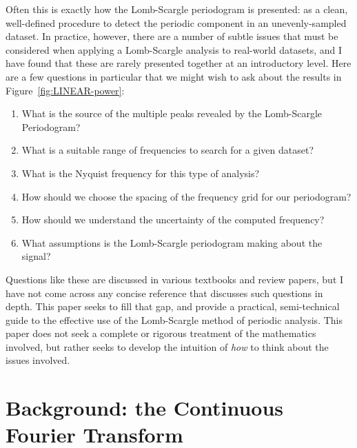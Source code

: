 \documentclass[preprint]{aastex}
\newcommand{\fig}[1]{Figure~\ref{fig:#1}}
\begin{document}
Often this is exactly how the Lomb-Scargle periodogram is presented: as a clean, well-defined procedure to detect the periodic component in an unevenly-sampled dataset.
In practice, however, there are a number of subtle issues that must be considered when applying a Lomb-Scargle analysis to real-world datasets, and I have found that these are rarely presented together at an introductory level.
Here are a few questions in particular that we might wish to ask about the results in \fig{LINEAR-power}:
\begin{enumerate}
  \item What is the source of the multiple peaks revealed by the Lomb-Scargle Periodogram?
  \item What is a suitable range of frequencies to search for a given dataset?
  \item What is the Nyquist frequency for this type of analysis?
  \item How should we choose the spacing of the frequency grid for our periodogram?
  \item How should we understand the uncertainty of the computed frequency?
  \item What assumptions is the Lomb-Scargle periodogram making about the signal?
\end{enumerate}
Questions like these are discussed in various textbooks and review papers, but I have not come across any concise reference that discusses such questions in depth.
This paper seeks to fill that gap, and provide a practical, semi-technical guide to the effective use of the Lomb-Scargle method of periodic analysis.
This paper does not seek a complete or rigorous treatment of the mathematics involved, but rather seeks to develop the intuition of {\it how} to think about the issues involved.


\section{Background: the Continuous Fourier Transform}
\end{document}
